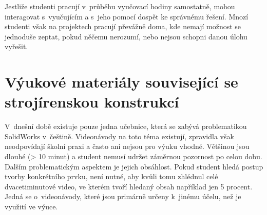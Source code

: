     Jestliže studenti pracují v~průběhu vyučovací hodiny samostatně, mohou interagovat s~vyučujícím a s~jeho pomocí dospět ke správnému řešení.
    Mnozí studenti však na projektech pracují převážně doma, kde nemají možnost se jednoduše zeptat, pokud něčemu nerozumí, nebo nejsou schopni danou úlohu vyřešit.

\section{Výukové materiály související se strojírenskou konstrukcí}
    V~dnešní době existuje pouze jedna učebnice, která se zabývá problematikou SolidWorks v~češtině.
    Videonávody na toto téma existují, zpravidla však neodpovídají školní praxi a často ani nejsou pro výuku vhodné.
    Většinou jsou dlouhé (> 10 minut) a student nemusí udržet záměrnou pozornost po celou dobu.
    Dalším problematickým aspektem je jejich obsáhlost.
    Pokud student hledá postup tvorby konkrétního prvku, není nutné, aby kvůli tomu zhlédnul celé dvacetiminutové video, ve kterém tvoří hledaný obsah například jen 5 procent. 
    Jedná se o~videonávody, které jsou primárně určeny k~jinému účelu, než je využití ve výuce. 
